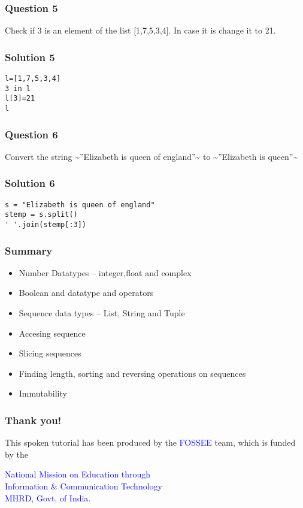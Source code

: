 \documentclass[presentation]{beamer}
\begin{document}
\begin{frame}
\frametitle{Question 5}
\label{sec-15}

  Check if 3 is an element of the list [1,7,5,3,4]. In case it is
change it to 21.
\end{frame}
\begin{frame}[fragile]
\frametitle{Solution 5}
\label{sec-16}

\lstset{language=Python}
\begin{lstlisting}
l=[1,7,5,3,4]
3 in l
l[3]=21
l
\end{lstlisting}
\end{frame}
\begin{frame}
\frametitle{Question 6}
\label{sec-17}

  Convert the string \~{}''Elizabeth is queen of england''\~{} to \~{}''Elizabeth is
queen''\~{}
\end{frame}
\begin{frame}[fragile]
\frametitle{Solution 6}
\label{sec-18}

\lstset{language=Python}
\begin{lstlisting}
s = "Elizabeth is queen of england"                                                                                                                 
stemp = s.split()                                                                                                                                   
' '.join(stemp[:3])
\end{lstlisting}
\end{frame}
\begin{frame}
\frametitle{Summary}
\label{sec-19}

\begin{itemize}
\item Number Datatypes -- integer,float and complex
\item Boolean and datatype and operators
\item Sequence data types -- List, String and Tuple
\item Accesing sequence
\item Slicing sequences
\item Finding length, sorting and reversing operations on sequences
\item Immutability
\end{itemize}
\end{frame}
\begin{frame}
\frametitle{Thank you!}
\label{sec-20}

  \begin{block}{}
  \begin{center}
  This spoken tutorial has been produced by the
  \textcolor{blue}{FOSSEE} team, which is funded by the 
  \end{center}
  \begin{center}
    \textcolor{blue}{National Mission on Education through \\
      Information \& Communication Technology \\ 
      MHRD, Govt. of India}.
  \end{center}  
  \end{block}
\end{frame}
\end{document}
